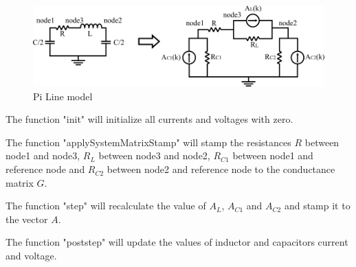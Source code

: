 \begin{figure}[h]
	\centering
	\includegraphics[scale=0.5]{img/PiLine.png} 
	\caption{Pi Line model}
	\label{fig:PiLine}
\end{figure}

The function "init" will initialize all currents and voltages with zero.

The function "applySystemMatrixStamp" will stamp the resistances $R$ between node1 and node3, $R_L$ between node3 and node2, $R_{C1}$ between node1 and reference node and $R_{C2}$ between node2 and reference node to the conductance matrix $G$.

The function "step" will recalculate the value of $A_L$, $A_{C1}$ and $A_{C2}$ and stamp it to the vector $A$.

The function "poststep" will update the values of inductor and capacitors current and voltage.

